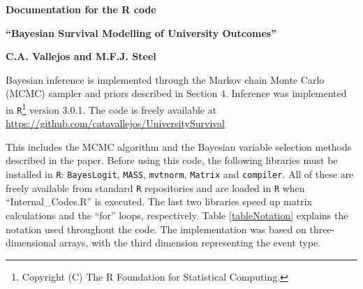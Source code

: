 \documentclass[a4paper,11pt]{article}
\theoremstyle{example}
\theoremstyle{theorem}
\theoremstyle{theorem}
\theoremstyle{proposition}
\theoremstyle{corollary}
\begin{document}
\centerline{\textbf{\Large Documentation for the R code}}
\centerline{\textbf{\Large ``Bayesian Survival Modelling of University Outcomes''}}
\centerline{\textbf{\Large C.A. Vallejos and M.F.J. Steel}}

\hfill

Bayesian inference is implemented through the Markov chain Monte Carlo (MCMC) sampler and priors described in Section 4. Inference was implemented in \texttt{R}\footnote{Copyright (C) The R Foundation for Statistical Computing.} version 3.0.1. The code is freely available at \newline \small{\href{https://github.com/catavallejos/UniversitySurvival}{\url{https://github.com/catavallejos/UniversitySurvival}}} \\

\normalsize

This includes the MCMC algorithm and the Bayesian variable selection methods described in the paper. Before using this code, the following libraries must be installed in \texttt{R}: \texttt{BayesLogit}, \texttt{MASS}, \texttt{mvtnorm}, \texttt{Matrix} and \texttt{compiler}. All of these are freely available from standard \texttt{R} repositories and are loaded in \texttt{R} when ``Internal\_Codes.R'' is executed. The last two libraries speed up matrix calculations and the ``for'' loops, respectively. Table \ref{tableNotation} explains the notation used throughout the code.  The implementation was based on three-dimensional arrays, with the third dimension representing the event type.
\end{document}

